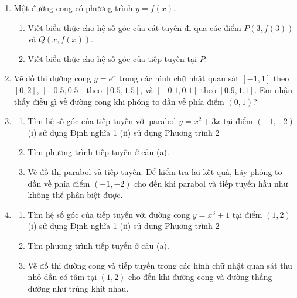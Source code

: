 \noindent
\begin{minipage}[t]{0.485\textwidth}
  \begin{enumerate}[label=\textbf{\arabic*.}, leftmargin=1.4em, labelsep=0.4em, itemsep=0.6em, topsep=0pt, parsep=0pt]
    \item Một đường cong có phương trình $y = f(x)$.
      \begin{enumerate}[label=(\alph*), leftmargin=1.3em, labelsep=0.35em, itemsep=1.5pt, topsep=1.5pt]
        \item Viết biểu thức cho hệ số góc của cát tuyến đi qua các điểm $P(3, f(3))$ và $Q(x, f(x))$.
        \item Viết biểu thức cho hệ số góc của tiếp tuyến tại $P$.
      \end{enumerate}

    \item[\llap{\graphicon\hspace{0.35em}}\textbf{2.}] Vẽ đồ thị đường cong $y = e^x$ trong các hình chữ nhật quan sát $[-1, 1]$ theo $[0, 2]$, $[-0.5, 0.5]$ theo $[0.5, 1.5]$, và $[-0.1, 0.1]$ theo $[0.9, 1.1]$. Em nhận thấy điều gì về đường cong khi phóng to dần về phía điểm $(0, 1)$?

    \item 
      \begin{enumerate}[label=(\alph*), leftmargin=1.3em, labelsep=0.35em, itemsep=1.5pt, topsep=0pt]
        \item Tìm hệ số góc của tiếp tuyến với parabol $y = x^2 + 3x$ tại điểm $(-1, -2)$
          \vspace{1pt}
          \newline\phantom{}\hspace{0.4em}(i) sử dụng Định nghĩa 1 \quad (ii) sử dụng Phương trình 2
        \item Tìm phương trình tiếp tuyến ở câu (a).
        \item[\llap{\graphicon\hspace{0.35em}}(c)] Vẽ đồ thị parabol và tiếp tuyến. Để kiểm tra lại kết quả, hãy phóng to dần về phía điểm $(-1, -2)$ cho đến khi parabol và tiếp tuyến hầu như không thể phân biệt được.
      \end{enumerate}

    \item 
      \begin{enumerate}[label=(\alph*), leftmargin=1.3em, labelsep=0.35em, itemsep=1.5pt, topsep=0pt]
        \item Tìm hệ số góc của tiếp tuyến với đường cong $y = x^3 + 1$ tại điểm $(1, 2)$
          \vspace{1pt}
          \newline\phantom{}\hspace{0.4em}(i) sử dụng Định nghĩa 1 \quad (ii) sử dụng Phương trình 2
        \item Tìm phương trình tiếp tuyến ở câu (a).
        \item[\llap{\graphicon\hspace{0.35em}}(c)] Vẽ đồ thị đường cong và tiếp tuyến trong các hình chữ nhật quan sát thu nhỏ dần có tâm tại $(1, 2)$ cho đến khi đường cong và đường thẳng dường như trùng khít nhau.
      \end{enumerate}


\end{enumerate}
\end{minipage}

